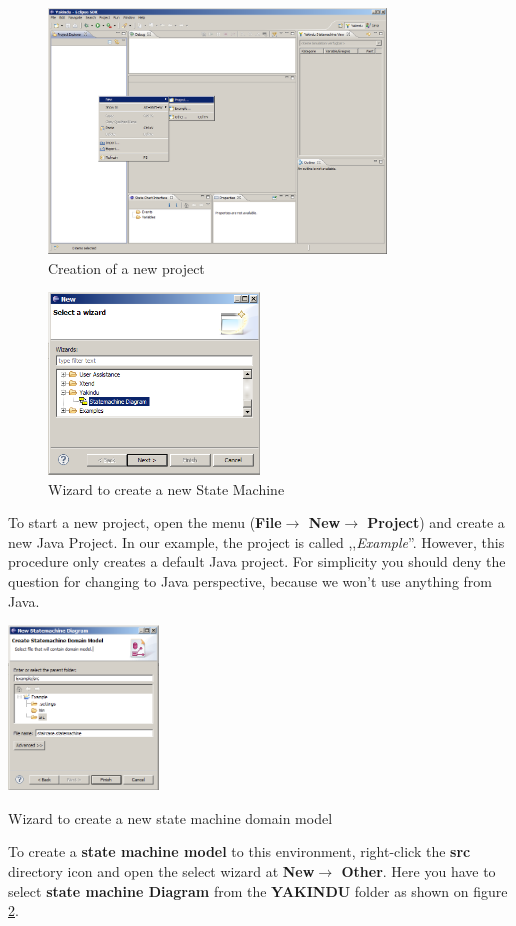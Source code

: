 \begin{figure}[ht]
\centering
\includegraphics[width=0.8\textwidth]{./Pictures/NewProject}
\caption{\label{fig:NewProject}Creation of a new project} 
\end{figure}
\newpage
\begin{figure}[h!]
\centering
\includegraphics[width=0.5\textwidth]{./Pictures/Wizard}
\caption{\label{fig:wizard}Wizard to create a new State Machine}
\end{figure}

To start a new project, open the menu (\textbf{File$\rightarrow$ New$\rightarrow$
Project}) and create a new Java Project. In our example, the project is called
,,\textit{Example}''.  However, this procedure only creates a default Java
project. For simplicity you should deny the question for changing to Java
perspective, because we won't use anything from Java. \newpage
\begin{floatingfigure}[r]{0.3\textwidth}
\centering
\includegraphics[width=0.3\textwidth]{./Pictures/Wizard2}
\caption{\label{fig:wizard2}Wizard to create a new state machine domain model}
\end{floatingfigure}
To create a \textbf{state machine model} to this environment, right-click the
\textbf{src} directory icon and open the select wizard at
\textbf{New$\rightarrow$ Other}. Here you have to select \textbf{state machine
Diagram} from the \textbf{YAKINDU} folder as shown on figure \ref{fig:wizard}.

